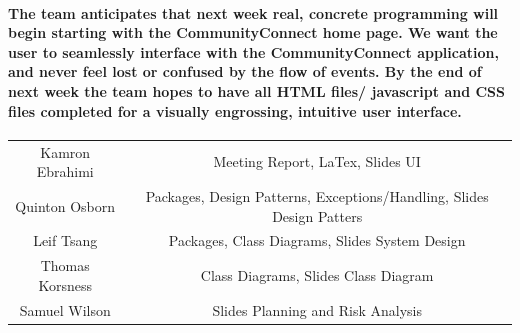 \documentclass[12pt]{article}
\begin{document}
  \paragraph{\normalfont \indent The team anticipates that next week real, concrete programming will begin starting with the CommunityConnect home page. We want the user to seamlessly interface with the CommunityConnect application, and never feel lost or confused by the flow of events. By the end of next week the team hopes to have all HTML files/ javascript and CSS files completed for a visually engrossing, intuitive user interface.
 } 
  
\begin{center}
\begin{tabular}{ |c|c| }
 \hline
 Kamron Ebrahimi & Meeting Report, LaTex, Slides UI\\
 Quinton Osborn & Packages, Design Patterns, Exceptions/Handling, Slides Design Patters\\
 Leif Tsang & Packages, Class Diagrams, Slides System Design \\
 Thomas Korsness & Class Diagrams, Slides Class Diagram \\
 Samuel Wilson& Slides Planning and Risk Analysis\\
 \hline

\end{tabular}
\end{center}
\end{document}

